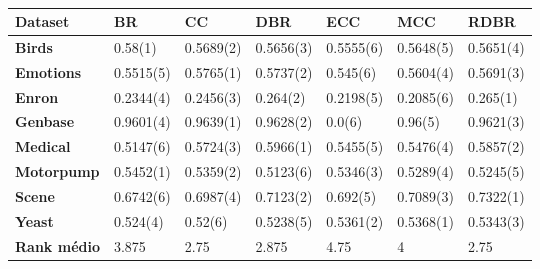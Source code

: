 \begin{table}[\tabmode]
\begin{tabular}{lllllll}
\hline
\textbf{Dataset}    & \textbf{BR} & \textbf{CC} & \textbf{DBR} & \textbf{ECC} & \textbf{MCC} & \textbf{RDBR} \\ \hline
\textbf{Birds}      & 0.58(1)     & 0.5689(2)   & 0.5656(3)    & 0.5555(6)    & 0.5648(5)    & 0.5651(4)     \\
\textbf{Emotions}   & 0.5515(5)   & 0.5765(1)   & 0.5737(2)    & 0.545(6)     & 0.5604(4)    & 0.5691(3)     \\
\textbf{Enron}      & 0.2344(4)   & 0.2456(3)   & 0.264(2)     & 0.2198(5)    & 0.2085(6)    & 0.265(1)      \\
\textbf{Genbase}    & 0.9601(4)   & 0.9639(1)   & 0.9628(2)    & 0.0(6)       & 0.96(5)      & 0.9621(3)     \\
\textbf{Medical}    & 0.5147(6)   & 0.5724(3)   & 0.5966(1)    & 0.5455(5)    & 0.5476(4)    & 0.5857(2)     \\
\textbf{Motorpump}  & 0.5452(1)   & 0.5359(2)   & 0.5123(6)    & 0.5346(3)    & 0.5289(4)    & 0.5245(5)     \\
\textbf{Scene}      & 0.6742(6)   & 0.6987(4)   & 0.7123(2)    & 0.692(5)     & 0.7089(3)    & 0.7322(1)     \\
\textbf{Yeast}      & 0.524(4)    & 0.52(6)     & 0.5238(5)    & 0.5361(2)    & 0.5368(1)    & 0.5343(3)     \\ \hline
\textbf{Rank médio} & 3.875       & 2.75        & 2.875        & 4.75         & 4            & 2.75          \\ \hline
\end{tabular}
\caption{}
\label{tab:EBAknn}
\end{table}